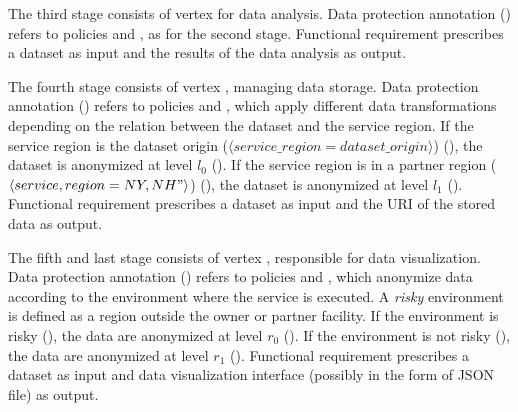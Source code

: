 The third stage consists of vertex   for data analysis.
Data protection annotation \myLambda() refers to policies  and , as for the second stage.
Functional requirement  prescribes a dataset as input and the results of the data analysis as output.


The fourth stage consists of vertex , managing data storage. Data protection annotation \myLambda() refers to policies  and , which apply different data transformations depending on the relation between the dataset and the service region.
If the service region is the dataset origin ($\langle service\_region=dataset\_origin\rangle$) (), the dataset is anonymized at level $l_0$ ().
If the service region is in a partner region ($\langle service,region={NY,NH}"\rangle$) (), the dataset is anonymized at level $l_1$ ().
Functional requirement  prescribes a dataset as input and the URI of the stored data as output.

The fifth and last stage consists of vertex , responsible for data visualization.
Data protection annotation \myLambda() refers to policies  and , which anonymize data according to the environment where the service is executed.
A \emph{risky} environment is defined as a region outside the owner or partner facility.
If the environment is risky (), the data are anonymized at level $r_0$ ().
If the environment is not risky (), the data are anonymized at level $r_1$ ().
Functional requirement  prescribes a dataset as input and data visualization interface (possibly in the form of JSON file) as output.

